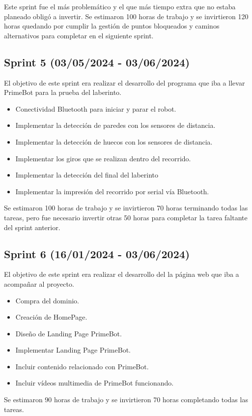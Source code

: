 Este sprint fue el más problemático y el que más tiempo extra que no estaba planeado obligó a invertir. Se estimaron 100 horas de trabajo y se invirtieron 120 horas quedando por cumplir la gestión de puntos bloqueados y caminos alternativos para completar en el siguiente sprint.
 
 \subsection {Sprint 5 (03/05/2024 - 03/06/2024)}
  El objetivo de este sprint era realizar el desarrollo del programa que iba a llevar PrimeBot para la prueba del laberinto.
  
   \begin{itemize}
\tightlist
\item
  Conectividad Bluetooth para iniciar y parar el robot.
\item
  Implementar la detección de paredes con los sensores de distancia.
\item
  Implementar la detección de huecos con los sensores de distancia.
  \item
  Implementar los giros que se realizan dentro del recorrido.
    \item
  Implementar la detección del final del laberinto
      \item
  Implementar la impresión del recorrido por serial vía Bluetooth.
\end{itemize}

Se estimaron 100 horas de trabajo y se invirtieron 70 horas terminando todas las tareas, pero fue necesario invertir otras 50 horas para completar la tarea faltante del sprint anterior.  
  
   \subsection {Sprint 6 (16/01/2024 - 03/06/2024)}
  El objetivo de este sprint era realizar el desarrollo del la página web que iba a acompañar al proyecto.
  
     \begin{itemize}
\tightlist
\item
  Compra del dominio.
\item
  Creación de HomePage.
\item
  Diseño de Landing Page PrimeBot.
  \item
  Implementar Landing Page PrimeBot.
        \item
  Incluir contenido relacionado con PrimeBot.
    \item
  Incluir vídeos multimedia de PrimeBot funcionando.
\end{itemize}
  Se estimaron 90 horas de trabajo y se invirtieron 70 horas completando todas las tareas.  
  
